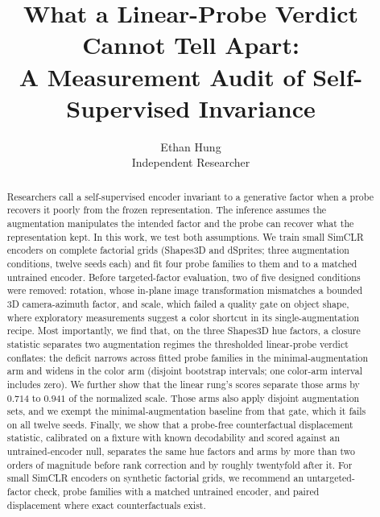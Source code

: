 \documentclass[10pt]{article}
\title{What a Linear-Probe Verdict Cannot Tell Apart: \\
A Measurement Audit of Self-Supervised Invariance}
\author{\name Ethan Hung \\
      \addr Independent Researcher}
\begin{document}
\maketitle

\begingroup
\renewcommand{\thefootnote}{\fnsymbol{footnote}}
\endgroup

\begin{abstract}
Researchers call a self-supervised encoder invariant to a generative factor when a probe recovers it
poorly from the frozen representation. The inference assumes the augmentation manipulates the
intended factor and the probe can recover what the representation kept. In this work, we test both
assumptions. We train small SimCLR encoders on complete factorial grids (Shapes3D and dSprites; three
augmentation conditions, twelve seeds each) and fit four probe families to them and to a matched
untrained encoder. Before targeted-factor evaluation, two of five designed conditions were removed:
rotation, whose in-plane image transformation mismatches a bounded 3D camera-azimuth factor, and
scale, which failed a quality gate on object shape, where exploratory measurements suggest a color
shortcut in its single-augmentation recipe. Most importantly, we find that, on the three Shapes3D hue
factors, a closure statistic separates two augmentation regimes the thresholded linear-probe verdict
conflates: the deficit narrows across fitted probe families in the minimal-augmentation arm and widens
in the color arm (disjoint bootstrap intervals; one color-arm interval includes zero). We further show
that the linear rung's scores separate those arms by $0.714$ to $0.941$ of the normalized scale. Those
arms also apply disjoint augmentation sets, and we exempt the minimal-augmentation baseline from that
gate, which it fails on all twelve seeds. Finally, we show that a probe-free counterfactual
displacement statistic, calibrated on a fixture with known decodability and scored against an
untrained-encoder null, separates the same hue factors and arms by more than two orders of magnitude
before rank correction and by roughly twentyfold after it. For small SimCLR encoders on synthetic
factorial grids, we recommend an untargeted-factor check, probe families with a matched untrained
encoder, and paired displacement where exact counterfactuals exist.
\end{abstract}
\end{document}
